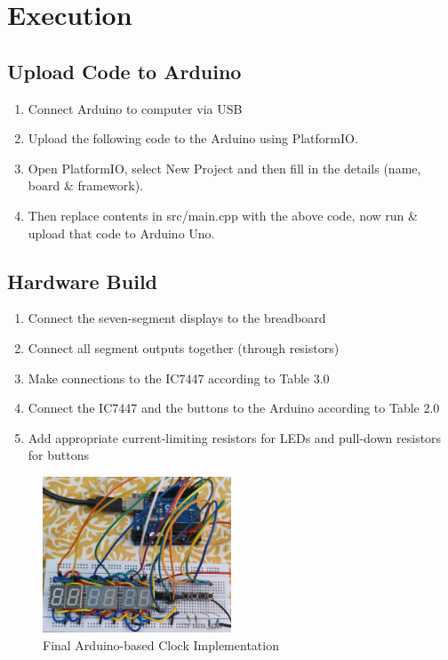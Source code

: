 \section{Execution}
\subsection{Upload Code to Arduino}
\begin{enumerate}
    \item Connect Arduino to computer via USB
    \item Upload the following code to the Arduino using PlatformIO.
\item Open PlatformIO, select New Project and then fill in the details (name, board \& framework).
\item Then replace contents in src/main.cpp with the above code, now run \& upload that code to Arduino Uno.
\end{enumerate}

\subsection{Hardware Build}
\begin{enumerate}
    \item Connect the seven-segment displays to the breadboard
    \item Connect all segment outputs together (through resistors)
    \item Make connections to the IC7447 according to Table 3.0
    \item Connect the IC7447 and the buttons to the Arduino according to Table 2.0
    \item Add appropriate current-limiting resistors for LEDs and pull-down resistors for buttons
\end{enumerate}


\begin{figure}[ht]
\centering
\includegraphics[width=0.5\textwidth]{figs/clock.jpg}
\caption{Final Arduino-based Clock Implementation}
\end{figure}


